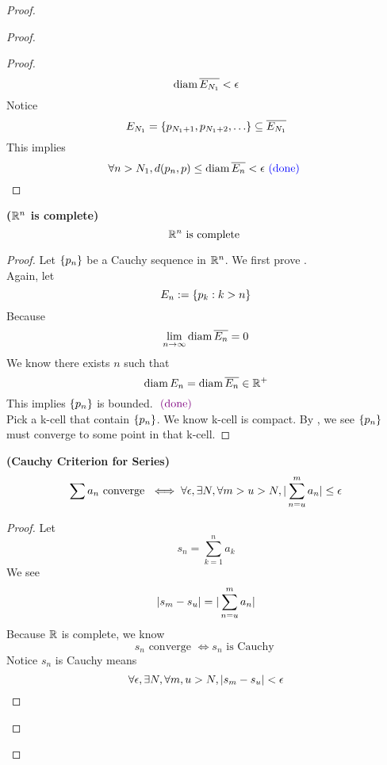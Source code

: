 \documentclass{report}
\begin{document}
\begin{proof}
\begin{proof}
\begin{proof}
\begin{equation}
\text{diam}\, \overline{E_{N_1}}<\epsilon 
\end{equation}
Notice
\begin{equation}
E_{N_1}=\set{p_{N_1+1},p_{N_1+2},\dots }\subseteq \overline{E_{N_1}}
\end{equation}
This implies 
\begin{equation}
\forall n>N_1, d(p_n,p)\leq \text{diam}\, \overline{E_n}<\epsilon \textcolor{blue}{\text{ (done) }}
\end{equation}
\end{proof}
\begin{corollary}
\label{3.10.9}
\textbf{($\mathbb{R}^n$ is complete)}
\begin{equation}
\mathbb{R}^n\text{ is complete }
\end{equation}
\end{corollary}
\begin{proof}
Let $\{ p_n \}$ be a Cauchy sequence in $\mathbb{R}^n$. We first prove .\\

Again, let
\begin{equation}
E_n:=\{ p_k:k>n \}
\end{equation}
Because 
\begin{equation}
\lim_{n\to\infty}\text{diam}\, \overline{E_n}=0
\end{equation}
We know there exists $n$ such that
 \begin{equation}
\text{diam}\, E_n=\text{diam}\, \overline{E_n}\in\mathbb{R}^+
\end{equation}
This implies $\{ p_n \}$ is bounded. $\textcolor{violet}{\text{ (done) }}$\\

Pick a k-cell that contain $\{ p_n \}$. We know k-cell is compact. By , we see $\{ p_n \}$ must converge to some point in that k-cell.
\end{proof}
\begin{corollary}
\label{3.10.10}
\textbf{(Cauchy Criterion for Series)}  
\begin{equation}
\sum a_n\text{ converge }\iff \forall \epsilon ,\exists N, \forall m>u>N, |\sum_{n=u}^m a_n|\leq \epsilon 
\end{equation}
\end{corollary}
\begin{proof}
Let 
 \begin{equation}
s_n=\sum_{k=1}^n a_k
\end{equation}
We see 
\begin{equation}
  |s_m-s_u|=|\sum_{n=u}^m a_n|
\end{equation}
Because $\mathbb{R}$ is complete, we know 
 \begin{equation}
s_n\text{ converge }\iff  s_n\text{ is Cauchy }
\end{equation}
Notice $s_n$ is Cauchy means 
 \begin{equation}
\forall \epsilon, \exists N, \forall m,u>N, |s_m-s_u|<\epsilon 
\end{equation}
\end{proof}

\end{proof}
\end{proof}
\end{document}
